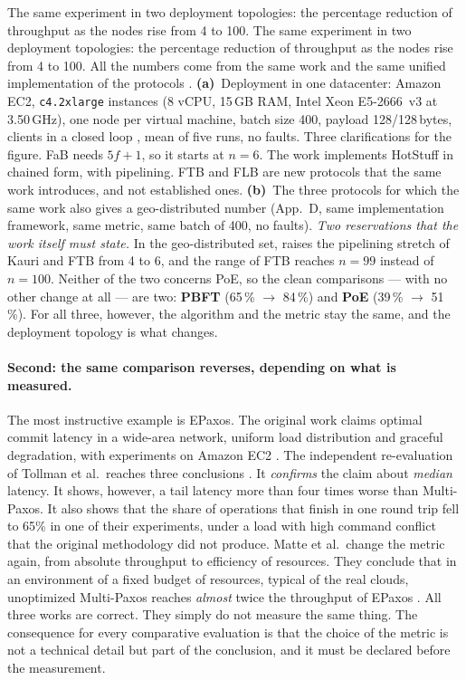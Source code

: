 %
{The same experiment in two deployment topologies: the percentage
reduction of throughput as the nodes rise from 4 to 100.}%
{The same experiment in two deployment topologies: the percentage
reduction of throughput as the nodes rise from 4 to 100. All the numbers
come from the same work and the same unified implementation of the
protocols \cite{amiri2024bedrock}. \textbf{(a)}~Deployment in one
datacenter: Amazon EC2, \texttt{c4.2xlarge} instances (8 vCPU,
15\,GB RAM, Intel Xeon E5-2666~v3 at 3.50\,GHz), one node per virtual
machine, batch size 400, payload 128/128\,bytes, clients in a closed loop
\cite{schroeder2006openclosed}\unver, mean of five runs, no faults. Three
clarifications for the figure. FaB needs $5f{+}1$, so it starts at $n=6$.
The work \cite{amiri2024bedrock} implements HotStuff in chained form,
with pipelining. FTB and FLB are new protocols that the same work
introduces, and not established ones. \textbf{(b)}~The three protocols
for which the same work also gives a geo-distributed number (App.~D, same
implementation framework, same metric, same batch of 400, no faults).
\emph{Two reservations that the work itself must state.} In the
geo-distributed set, \cite{amiri2024bedrock} raises the pipelining
stretch of Kauri and FTB from 4 to 6, and the range of FTB reaches $n=99$
instead of $n=100$. Neither of the two concerns PoE, so the clean
comparisons --- with no other change at all --- are two: \textbf{PBFT}
(65\,\% $\to$ 84\,\%) and \textbf{PoE} (39\,\% $\to$ 51\,\%). For all
three, however, the algorithm and the metric stay the same, and the
deployment topology is what changes.}%
{}

\paragraph{Second: the same comparison reverses, depending on what is
measured.}
The most instructive example is EPaxos. The original work claims optimal
commit latency in a wide-area network, uniform load distribution and
graceful degradation, with experiments on Amazon EC2
\cite{moraru2013epaxos}. The independent re-evaluation of Tollman et al.\
reaches three conclusions \cite{tollman2021epaxosrevisited}. It
\emph{confirms} the claim about \emph{median} latency. It shows, however,
a tail latency more than four times worse than Multi-Paxos. It also shows
that the share of operations that finish in one round trip fell to 65\%
in one of their experiments, under a load with high command conflict that
the original methodology did not produce. Matte et al.\ change the metric
again, from absolute throughput to efficiency of resources. They conclude
that in an environment of a fixed budget of resources, typical of the
real clouds, unoptimized Multi-Paxos reaches \emph{almost} twice the
throughput of EPaxos \cite{matte2021wasteful}. All three works are
correct. They simply do not measure the same thing. The consequence for
every comparative evaluation is that the choice of the metric is not a
technical detail but part of the conclusion, and it must be declared
before the measurement.

